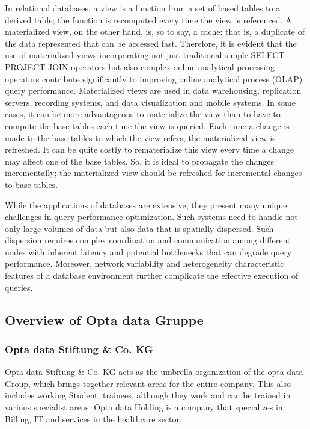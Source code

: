 In relational databases, a view is a function from a set of based tables to a derived table; the function is recomputed every time the view is referenced. A materialized view, on the other hand, is, so to say, a cache: that is, a duplicate of the data represented that can be accessed fast. Therefore, it is evident that the use of materialized views incorporating not just traditional simple SELECT PROJECT JOIN operators but also complex online analytical processing operators contribute significantly to improving online analytical process (OLAP) query performance. Materialized views are used in data warehousing, replication servers, recording systems, and data visualization and mobile systems. In some cases, it can be more advantageous to materialize the view than to have to compute the base tables each time the view is queried. Each time a change is made to the base tables to which the view refers, the materialized view is refreshed. It can be quite costly to rematerialize this view every time a change may affect one of the base tables. So, it is ideal to propagate the changes incrementally; the materialized view should be refreshed for incremental changes to base tables.\cite{Data_warehousing,efficient_incremental,rashid2009role}\vspace{.4cm}

While the applications of databases are extensive, they present many unique challenges in query performance optimization. Such systems need to handle not only large volumes of data but also data that is spatially dispersed. Such dispersion requires complex coordination and communication among different nodes with inherent latency and potential bottlenecks that can degrade query performance. Moreover, network variability and heterogeneity characteristic features of a database environment further complicate the effective execution of queries.

\subsection{Overview of Opta data Gruppe}
\subsubsection{Opta data Stiftung \& Co. KG }
Opta data Stiftung \& Co. KG acts as the umbrella organization of the opta data Group, which brings together relevant areas for the entire company. This also includes working Student, trainees, although they work and can be trained in various specialist areas. Opta data Holding is a company that specializes in Billing, IT and services in the healthcare sector.

